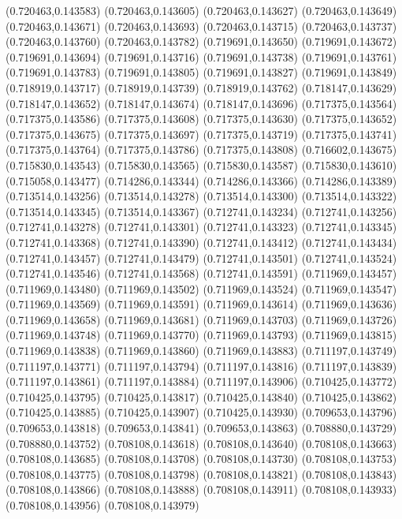 (0.720463,0.143583)
(0.720463,0.143605)
(0.720463,0.143627)
(0.720463,0.143649)
(0.720463,0.143671)
(0.720463,0.143693)
(0.720463,0.143715)
(0.720463,0.143737)
(0.720463,0.143760)
(0.720463,0.143782)
(0.719691,0.143650)
(0.719691,0.143672)
(0.719691,0.143694)
(0.719691,0.143716)
(0.719691,0.143738)
(0.719691,0.143761)
(0.719691,0.143783)
(0.719691,0.143805)
(0.719691,0.143827)
(0.719691,0.143849)
(0.718919,0.143717)
(0.718919,0.143739)
(0.718919,0.143762)
(0.718147,0.143629)
(0.718147,0.143652)
(0.718147,0.143674)
(0.718147,0.143696)
(0.717375,0.143564)
(0.717375,0.143586)
(0.717375,0.143608)
(0.717375,0.143630)
(0.717375,0.143652)
(0.717375,0.143675)
(0.717375,0.143697)
(0.717375,0.143719)
(0.717375,0.143741)
(0.717375,0.143764)
(0.717375,0.143786)
(0.717375,0.143808)
(0.716602,0.143675)
(0.715830,0.143543)
(0.715830,0.143565)
(0.715830,0.143587)
(0.715830,0.143610)
(0.715058,0.143477)
(0.714286,0.143344)
(0.714286,0.143366)
(0.714286,0.143389)
(0.713514,0.143256)
(0.713514,0.143278)
(0.713514,0.143300)
(0.713514,0.143322)
(0.713514,0.143345)
(0.713514,0.143367)
(0.712741,0.143234)
(0.712741,0.143256)
(0.712741,0.143278)
(0.712741,0.143301)
(0.712741,0.143323)
(0.712741,0.143345)
(0.712741,0.143368)
(0.712741,0.143390)
(0.712741,0.143412)
(0.712741,0.143434)
(0.712741,0.143457)
(0.712741,0.143479)
(0.712741,0.143501)
(0.712741,0.143524)
(0.712741,0.143546)
(0.712741,0.143568)
(0.712741,0.143591)
(0.711969,0.143457)
(0.711969,0.143480)
(0.711969,0.143502)
(0.711969,0.143524)
(0.711969,0.143547)
(0.711969,0.143569)
(0.711969,0.143591)
(0.711969,0.143614)
(0.711969,0.143636)
(0.711969,0.143658)
(0.711969,0.143681)
(0.711969,0.143703)
(0.711969,0.143726)
(0.711969,0.143748)
(0.711969,0.143770)
(0.711969,0.143793)
(0.711969,0.143815)
(0.711969,0.143838)
(0.711969,0.143860)
(0.711969,0.143883)
(0.711197,0.143749)
(0.711197,0.143771)
(0.711197,0.143794)
(0.711197,0.143816)
(0.711197,0.143839)
(0.711197,0.143861)
(0.711197,0.143884)
(0.711197,0.143906)
(0.710425,0.143772)
(0.710425,0.143795)
(0.710425,0.143817)
(0.710425,0.143840)
(0.710425,0.143862)
(0.710425,0.143885)
(0.710425,0.143907)
(0.710425,0.143930)
(0.709653,0.143796)
(0.709653,0.143818)
(0.709653,0.143841)
(0.709653,0.143863)
(0.708880,0.143729)
(0.708880,0.143752)
(0.708108,0.143618)
(0.708108,0.143640)
(0.708108,0.143663)
(0.708108,0.143685)
(0.708108,0.143708)
(0.708108,0.143730)
(0.708108,0.143753)
(0.708108,0.143775)
(0.708108,0.143798)
(0.708108,0.143821)
(0.708108,0.143843)
(0.708108,0.143866)
(0.708108,0.143888)
(0.708108,0.143911)
(0.708108,0.143933)
(0.708108,0.143956)
(0.708108,0.143979)
